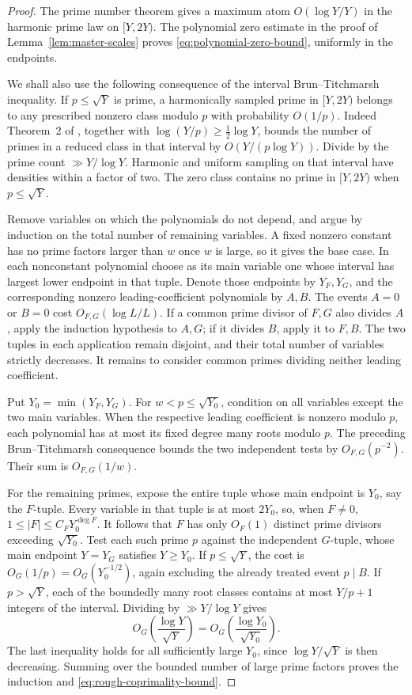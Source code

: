 \begin{proof}
The prime number theorem gives a maximum atom
\(O(\log Y/Y)\) in the harmonic prime law on \([Y,2Y)\).
The polynomial zero estimate in the proof of
Lemma~\ref{lem:master-scales} proves
\eqref{eq:polynomial-zero-bound}, uniformly in the endpoints.

We shall also use the following consequence of the interval
Brun--Titchmarsh inequality.  If \(p\le\sqrt Y\) is prime, a
harmonically sampled prime in \([Y,2Y)\) belongs to any prescribed
nonzero class modulo \(p\) with probability \(O(1/p)\).
Indeed Theorem~2 of \cite{Yamada}, together with
\(\log(Y/p)\ge\tfrac12\log Y\), bounds the number of primes in a
reduced class in that interval by \(O(Y/(p\log Y))\).
Divide by the prime count \(\gg Y/\log Y\).
Harmonic and uniform sampling on that interval
have densities within a factor of two.  The zero class contains no
prime in \([Y,2Y)\) when \(p\le\sqrt Y\).

Remove variables on which the polynomials do not depend, and argue
by induction on the total number of remaining variables.  A fixed
nonzero constant has no prime factors larger than \(w\) once \(w\)
is large, so it gives the base case.  In each nonconstant polynomial
choose as its main variable one whose interval has largest lower
endpoint in that tuple.  Denote those endpoints by \(Y_F,Y_G\),
and the corresponding nonzero leading-coefficient polynomials by
\(A,B\).  The events \(A=0\) or \(B=0\) cost
\(O_{F,G}(\log L/L)\).  If a common prime divisor of \(F,G\)
also divides \(A\), apply the induction hypothesis to \(A,G\);
if it divides \(B\), apply it to \(F,B\).  The two tuples in each
application remain disjoint, and their total number of variables
strictly decreases.  It remains to consider common primes dividing
neither leading coefficient.

Put \(Y_0=\min(Y_F,Y_G)\).  For \(w<p\le\sqrt{Y_0}\), condition
on all variables except the two main variables.  When the respective
leading coefficient is nonzero modulo \(p\), each polynomial has at
most its fixed degree many roots modulo \(p\).  The preceding
Brun--Titchmarsh consequence bounds the two independent tests by
\(O_{F,G}(p^{-2})\).  Their sum is \(O_{F,G}(1/w)\).

For the remaining primes, expose the entire tuple whose main endpoint
is \(Y_0\), say the \(F\)-tuple.  Every variable in that tuple is
at most \(2Y_0\), so, when \(F\ne0\),
\(1\le |F|\le C_FY_0^{\deg F}\).  It follows that \(F\) has
only \(O_F(1)\) distinct prime divisors exceeding \(\sqrt{Y_0}\).
Test each such prime \(p\) against the independent \(G\)-tuple,
whose main endpoint \(Y=Y_G\) satisfies \(Y\ge Y_0\).  If
\(p\le\sqrt Y\), the cost is \(O_G(1/p)=O_G(Y_0^{-1/2})\),
again excluding the already treated event \(p\mid B\).  If
\(p>\sqrt Y\), each of the boundedly many root classes contains
at most \(Y/p+1\) integers of the interval.  Dividing by
\(\gg Y/\log Y\) gives
\[
 O_G\left(\frac{\log Y}{\sqrt Y}\right)
 =O_G\left(\frac{\log Y_0}{\sqrt{Y_0}}\right).
\]
The last inequality holds for all sufficiently large \(Y_0\), since
\(\log Y/\sqrt Y\) is then decreasing.  Summing over the bounded
number of large prime factors proves the induction and
\eqref{eq:rough-coprimality-bound}.


\end{proof}

